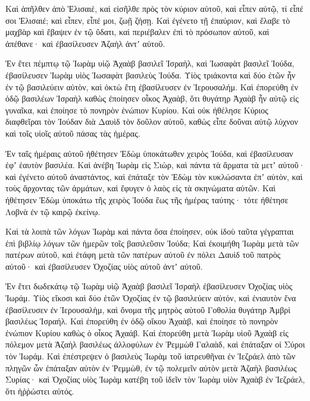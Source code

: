 {Καὶ ἀπῆλθεν ἀπὸ Ἑλισαιὲ, καὶ εἰσῆλθε πρὸς τὸν κύριον αὐτοῦ, καὶ εἶπεν αὐτῷ, τί εἶπέ σοι Ἑλισαιέ; καὶ εἶπεν, εἶπέ μοι, ζωῇ ζήσῃ.
Καὶ ἐγένετο τῇ ἐπαύριον, καὶ ἔλαβε τὸ μαχβὰρ καὶ ἔβαψεν ἐν τῷ ὕδατι, καὶ περιέβαλεν ἐπὶ τὸ πρόσωπον αὐτοῦ, καὶ ἀπέθανε· καὶ ἐβασίλευσεν Ἀζαὴλ ἀντʼ αὐτοῦ.
\par }{\PP {}Ἐν ἔτει πέμπτῳ τῷ Ἰωρὰμ υἱῷ Ἀχαὰβ βασιλεῖ Ἰσραὴλ, καὶ Ἰωσαφὰτ βασιλεῖ Ἰούδα, ἐβασίλευσεν Ἰωρὰμ υἱὸς Ἰωσαφὰτ βασιλεὺς Ἰούδα.
Υἱὸς τριάκοντα καὶ δύο ἐτῶν ἦν ἐν τῷ βασιλεύειν αὐτὸν, καὶ ὀκτὼ ἔτη ἐβασίλευσεν ἐν Ἱερουσαλήμ.
Καὶ ἐπορεύθη ἐν ὁδῷ βασιλέων Ἰσραὴλ καθὼς ἐποίησεν οἶκος Ἀχαὰβ, ὅτι θυγάτηρ Ἀχαὰβ ἦν αὐτῷ εἰς γυναῖκα, καὶ ἐποίησε τὸ πονηρὸν ἐνώπιον Κυρίου.
Καὶ οὐκ ἠθέλησε Κύριος διαφθεῖραι τὸν Ἰούδαν διὰ Δαυὶδ τὸν δοῦλον αὐτοῦ, καθὼς εἶπε δοῦναι αὐτῷ λύχνον καὶ τοῖς υἱοῖς αὐτοῦ πάσας τὰς ἡμέρας.
\par }{\PP {}Ἐν ταῖς ἡμέραις αὐτοῦ ἠθέτησεν Ἐδὼμ ὑποκάτωθεν χειρὸς Ἰούδα, καὶ ἐβασίλευσαν ἐφʼ ἑαυτὸν βασιλέα.
Καὶ ἀνέβη Ἰωρὰμ εἰς Σιὼρ, καὶ πάντα τὰ ἅρματα τὰ μετʼ αὐτοῦ· καὶ ἐγένετο αὐτοῦ ἀναστάντος, καὶ ἐπάταξε τὸν Ἐδὼμ τὸν κυκλώσαντα ἐπʼ αὐτὸν, καὶ τοὺς ἄρχοντας τῶν ἁρμάτων, καὶ ἔφυγεν ὁ λαὸς εἰς τὰ σκηνώματα αὐτῶν.
Καὶ ἠθέτησεν Ἐδὼμ ὑποκάτω τῆς χειρὸς Ἰούδα ἕως τῆς ἡμέρας ταύτης· τότε ἠθέτησε Λοβνὰ ἐν τῷ καιρῷ ἐκείνῳ.
\par }{\PP {}Καὶ τὰ λοιπὰ τῶν λόγων Ἰωρὰμ καὶ πάντα ὅσα ἐποίησεν, οὐκ ἰδοὺ ταῦτα γέγραπται ἐπὶ βιβλίῳ λόγων τῶν ἡμερῶν τοῖς βασιλεῦσιν Ἰούδα;
Καὶ ἐκοιμήθη Ἰωρὰμ μετὰ τῶν πατέρων αὐτοῦ, καὶ ἐτάφη μετὰ τῶν πατέρων αὐτοῦ ἐν πόλει Δαυὶδ τοῦ πατρὸς αὐτοῦ· καὶ ἐβασίλευσεν Ὀχοζίας υἱὸς αὐτοῦ ἀντʼ αὐτοῦ.
\par }{\PP {}Ἐν ἔτει δωδεκάτῳ τῷ Ἰωρὰμ υἱῷ Ἀχαὰβ βασιλεῖ Ἰσραὴλ ἐβασίλευσεν Ὀχοζίας υἱὸς Ἰωράμ.
Υἱὸς εἴκοσι καὶ δύο ἐτῶν Ὀχοζίας ἐν τῷ βασιλεύειν αὐτόν, καὶ ἐνιαυτὸν ἕνα ἐβασίλευσεν ἐν Ἱερουσαλὴμ, καὶ ὄνομα τῆς μητρὸς αὐτοῦ Γοθολία θυγάτηρ Ἀμβρὶ βασιλέως Ἰσραήλ.
Καὶ ἐπορεύθη ἐν ὁδῷ οἴκου Ἀχαὰβ, καὶ ἐποίησε τὸ πονηρὸν ἐνώπιον Κυρίου καθὼς ὁ οἶκος Ἀχαάβ.
Καὶ ἐπορεύθη μετὰ Ἰωρὰμ υἱοῦ Ἀχαὰβ εἰς πόλεμον μετὰ Ἁζαὴλ βασιλέως ἀλλοφύλων ἐν Ῥεμμὼθ Γαλαὰδ, καὶ ἐπάταξαν οἱ Σύροι τὸν Ἰωράμ.
Καὶ ἐπέστρεψεν ὁ βασιλεὺς Ἰωρὰμ τοῦ ἰατρευθῆναι ἐν Ἰεζράελ ἀπὸ τῶν πληγῶν ὧν ἐπάταξαν αὐτὸν ἐν Ῥεμμὼθ, ἐν τῷ πολεμεῖν αὐτὸν μετὰ Ἁζαὴλ βασιλέως Συρίας· καὶ Ὀχοζίας υἱὸς Ἰωρὰμ κατέβη τοῦ ἰδεῖν τὸν Ἰωρὰμ υἱὸν Ἀχαὰβ ἐν Ἰεζράελ, ὅτι ἠῤῥώστει αὐτός.

}
